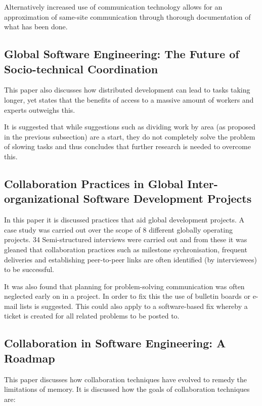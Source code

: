 \documentclass{l4proj}
\begin{document}
Alternatively increased use of communication technology allows for an approximation of same-site communication through thorough documentation of what has been done.

\subsection {Global Software Engineering: The Future of Socio-technical Coordination}

This paper also discusses how distributed development can lead to tasks taking longer, yet states that the benefits of access to a massive amount of workers and experts outweighs this.

It is suggested that while suggestions such as dividing work by area (as proposed in the previous subsection) are a start, they do not completely solve the problem of slowing tasks and thus concludes that further research is needed to overcome this.



\subsection {Collaboration Practices in Global Inter-organizational Software Development Projects}

In this paper it is discussed practices that aid global development projects.  A case study was carried out over the scope of 8 different globally operating projects.  34 Semi-structured interviews were carried out and from these it was gleaned that collaboration practices such as milestone sychronisation, frequent deliveries and establishing peer-to-peer links are often identified (by interviewees) to be successful. 

It was also found that planning for problem-solving communication was often neglected early on in a project.  In order to fix this the use of bulletin boards or e-mail lists is suggested.  This could also apply to a software-based fix whereby a ticket is created for all related problems to be posted to.



\subsection {Collaboration in Software Engineering: A Roadmap}

This paper discusses how collaboration techniques have evolved to remedy the limitations of memory. It is discussed how the goals of collaboration techniques are:
\end{document}

